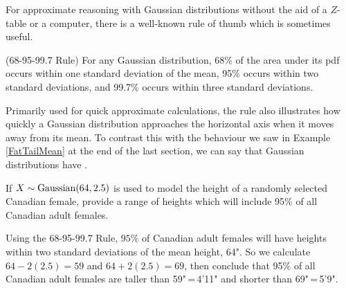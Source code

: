 For approximate reasoning with Gaussian distributions without the aid of a $Z$-table or a computer, there is a well-known rule of thumb which is sometimes useful.

\begin{proposition}\label{GaussianRuleThumb}(68-95-99.7 Rule) For any Gaussian distribution, 68\% of the area under its pdf occurs within one standard deviation of the mean, 95\% occurs within two standard deviations, and 99.7\% occurs within three standard deviations.
\begin{center}
 \end{center}
\end{proposition}

Primarily used for quick approximate calculations, the rule also illustrates how quickly a Gaussian distribution approaches the horizontal axis when it moves away from its mean. To contrast this with the behaviour we saw in Example \ref{FatTailMean} at the end of the last section, we can say that Gaussian distributions have .

\begin{example}If $X \sim \operatorname{Gaussian}(64,2.5)$ is used to model the height of a randomly selected Canadian female, provide a range of heights which will include 95\% of all Canadian adult females.

Using the 68-95-99.7 Rule, $95\%$ of Canadian adult females will have heights within two standard deviations of the mean height, 64". So we calculate $64 - 2(2.5) = 59$ and $64 + 2(2.5) =69$, then conclude that 95\% of all Canadian adult females are taller than 59"\,=\,4'11" and shorter than 69"\,=\,5'9".
\end{example}




